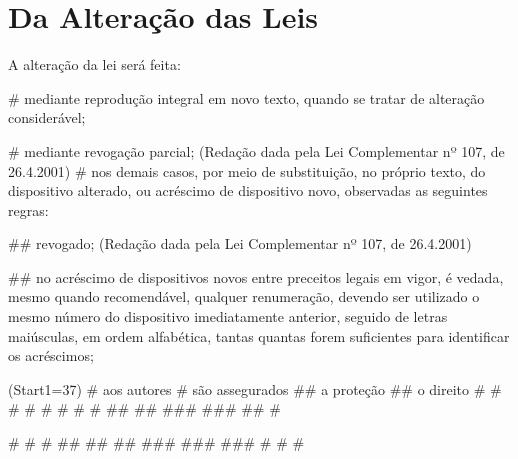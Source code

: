 \documentclass[a5paper,capitulo,titlepage=false]{br-lex}
\begin{document}
	\section{Da Alteração das Leis}
	
	\artigo A alteração da lei será feita:
	
	\begin{easylist}
		#  mediante reprodução integral em novo texto, quando se tratar de alteração considerável;
		
		#  mediante revogação parcial;    (Redação dada pela Lei Complementar nº 107, de 26.4.2001)
		# nos demais casos, por meio de substituição, no próprio texto, do dispositivo alterado, ou acréscimo de dispositivo novo, observadas as seguintes regras:
		
		
		## revogado; (Redação dada pela Lei Complementar nº 107, de 26.4.2001)
		
		
		## no acréscimo de dispositivos novos entre preceitos legais em vigor, é vedada, mesmo quando recomendável, qualquer renumeração, devendo ser utilizado o mesmo número do dispositivo imediatamente anterior, seguido de letras maiúsculas, em ordem alfabética, tantas quantas forem suficientes para identificar os acréscimos;
			\end{easylist}

\begin{easylist}
\ListProperties(Start1=37)
# aos autores
# são assegurados
## a proteção ## o direito
#
#
#
#
#
#
#
#
##
##
###
###
##
#

\end{easylist}

\addtocounter{artigo}{100}

\artigo

\begin{easylist}
	#
	#
	#
	## ## ## 
	### ### ###
	#
	#
	#

\end{easylist}
\end{document}
